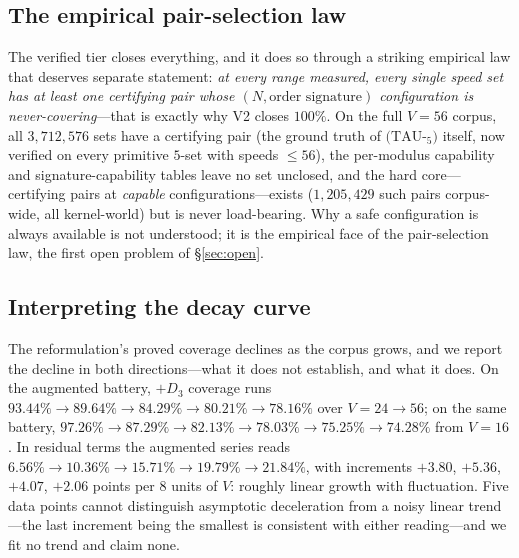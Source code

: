 \documentclass[11pt,a4paper]{article}
\numberwithin{equation}{section}
\theoremstyle{plain}
\theoremstyle{plain}
\theoremstyle{definition}
\theoremstyle{remark}
\begin{document}
\subsection{The empirical pair-selection law}

The verified tier closes everything, and it does so through a striking
empirical law that deserves separate statement: \emph{at every range
measured, every single speed set has at least one certifying pair whose
$(N,\text{order signature})$ configuration is never-covering}---that is
exactly why V2 closes $100\%$. On the full $V=56$ corpus, all
$3{,}712{,}576$ sets have a certifying pair (the ground truth of
$(\mathrm{TAU}$-$_5)$ itself, now verified on every primitive $5$-set
with speeds $\le56$), the per-modulus capability and
signature-capability tables leave no set unclosed, and the hard
core---certifying pairs at \emph{capable} configurations---exists
($1{,}205{,}429$ such pairs corpus-wide, all kernel-world) but is never
load-bearing. Why a safe configuration is always available is not
understood; it is the empirical face of the pair-selection law, the
first open problem of \S\ref{sec:open}.

\subsection{Interpreting the decay curve}

The reformulation's proved coverage declines as the corpus grows, and we
report the decline in both directions---what it does not
establish, and what it does. On the augmented battery, $+D_3$ coverage
runs $93.44\%\to89.64\%\to84.29\%\to80.21\%\to78.16\%$ over
$V=24\to56$; on the same battery,
$97.26\%\to87.29\%\to82.13\%\to78.03\%\to75.25\%\to74.28\%$ from
$V=16$. In residual terms the augmented series reads
$6.56\%\to10.36\%\to15.71\%\to19.79\%\to21.84\%$, with increments
$+3.80$, $+5.36$, $+4.07$, $+2.06$ points per $8$ units of $V$: roughly
linear growth with fluctuation. Five data points cannot distinguish
asymptotic deceleration from a noisy linear trend---the last increment
being the smallest is consistent with either reading---and we fit no
trend and claim none.
\end{document}
